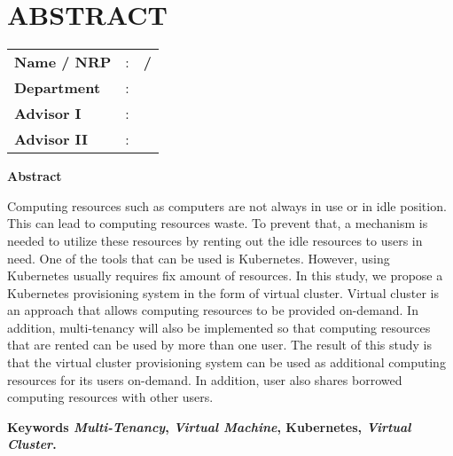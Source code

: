 \chapter*{ABSTRACT}


\vspace{2ex}

\begin{center}
  \large\textbf{\engtatitle{}}
\end{center}

\vspace{2ex}

\begingroup
\setlength{\tabcolsep}{0pt}

\noindent
\begin{tabularx}{\textwidth}{l >{\centering}m{3em} X}
  \textbf{Name / NRP} & : & \textbf{\name{} / \nrp{}} \\
  \textbf{Department} & : & \textbf{\engdepartment{}} \\
  \textbf{Advisor I}  & : & \textbf{\advisor{}}       \\
  \textbf{Advisor II} & : & \textbf{\coadvisor{}}     \\
\end{tabularx}
\endgroup

\noindent
\textbf{Abstract}

Computing resources such as computers are not always in use or in idle
position. This can lead to computing resources waste. To prevent that,
a mechanism is needed to utilize these resources  by renting out the
idle resources to users in need. One of the tools that can be used is Kubernetes.
However, using Kubernetes usually requires fix amount of resources. In this study,
we propose a Kubernetes provisioning system in the form of virtual cluster. Virtual
cluster is an approach that allows computing resources to be provided on-demand. In
addition, multi-tenancy will also be implemented so that computing resources that are
rented can be used by more than one user. The result of this study is that the virtual
cluster provisioning system can be used as additional computing resources for its users
on-demand. In addition, user also shares borrowed computing resources with other users.

\vspace{2ex}
\noindent
\textbf{Keywords \emph{Multi-Tenancy}, \emph{Virtual Machine}, Kubernetes, \emph{Virtual Cluster}.}
